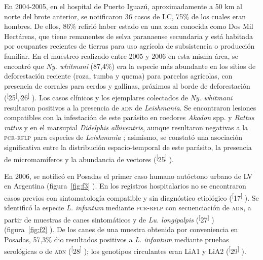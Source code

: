 \documentclass{article}
\begin{document}
En 2004-2005, en el hospital de Puerto Iguazú, aproximadamente a 50 km al norte
del brote anterior, se notificaron 36 casos de LC, 75\% de los cuales eran
hombres. De ellos, 86\% refirió haber estado en una zona conocida como Dos Mil
Hectáreas, que tiene remanentes de selva paranaense secundaria y está habitada
por ocupantes recientes de tierras para uso agrícola de subsistencia o
producción familiar. En el muestreo realizado entre 2005 y 2006 en esta misma
área, se encontró que \textit{Ny. whitmani}
(87,4\%) era la especie más abundante en los sitios de deforestación reciente
(roza, tumba y quema) para parcelas agrícolas, con presencia de corrales para
cerdos y gallinas, próximos al borde de deforestación
(\textsuperscript{[}25\textsuperscript{]},\textsuperscript{[}26\textsuperscript{]}
). Los casos clínicos y los ejemplares colectados de \textit{Ny. whitmani}
resultaron positivos a la presencia de \textsc{adn} de \textit{Leishmania}. Se encontraron lesiones compatibles con la infestación de este parásito en
roedores \textit{Akodon}
spp. y \textit{Rattus rattus}
y en el marsupial \textit{Didelphis albiventris}, aunque resultaron negativas a la \textsc{pcr}-\textsc{rflp} para especies de \textit{Leishmania}
; asimismo, se constató una asociación significativa entre la distribución
espacio-temporal de este parásito, la presencia de micromamíferos y la
abundancia de vectores (\textsuperscript{[}25\textsuperscript{]}
).

En 2006, se notificó en Posadas el primer caso humano autóctono urbano de LV en
Argentina (figura~\ref{fig:f3}
). En los registros hospitalarios no se encontraron casos previos con
sintomatología compatible y sin diagnóstico etiológico
(\textsuperscript{[}17\textsuperscript{]}
). Se identificó la especie \textit{L. infantum}
mediante \textsc{pcr}-\textsc{rflp} con secuenciación de \textsc{adn}, a partir de muestras de canes
sintomáticos y de \textit{Lu. longipalpis}
(\textsuperscript{[}27\textsuperscript{]}
) (figura~\ref{fig:f2}
). De los canes de una muestra obtenida por conveniencia en Posadas, 57,3\% dio
resultados positivos a \textit{L. infantum}
mediante pruebas serológicas o de \textsc{adn} (\textsuperscript{[}28\textsuperscript{]}
); los genotipos circulantes eran LiA1 y LiA2
(\textsuperscript{[}29\textsuperscript{]}
).
\end{document}
